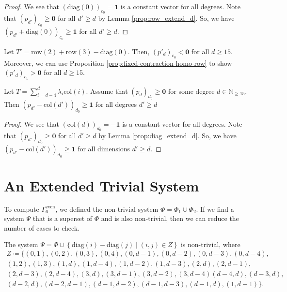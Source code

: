   
\begin{proof}
    We see that \( (\mathrm{diag}(0))_{c_0} = \mathbf 1 \) is a constant vector for all degrees. Note that \( (p_{d'})_{c_0} \geq \mathbf 0 \) for all \( d' \geq d \) by Lemma \ref{prop:row_extend_d}. So, we have \( (p_{d'} + \mathrm{diag}(0))_{c_0} \geq \mathbf 1 \) for all \( d' \geq d \).
\end{proof}
  
  
  
\begin{example}
    Let \( T' = \mathrm{row}(2) + \mathrm{row}(3) - \mathrm{diag}(0) \).
    Then, \( (p'_d)_{c_0} < \mathbf{0} \) for all \( d \geq 15 \). Moreover, we can use Proposition \ref{prop:fixed-contraction-homo-row} to show \( (p'_d)_{c_1} > \mathbf{0} \) for all \( d \geq 15 \).
  \end{example}

\begin{proposition}\label{prop:col_homo_d_zero_diag}
Let \( T = \sum_{i=d-4}^d \lambda_i \mathrm{col}(i)\). Assume that \( (p_d)_{d_0} \geq \mathbf{0} \) for some degree \( d \in \mathbb{N}_{\geq 15} \). Then \( (p_{d'} - \mathrm{col}(d'))_{d_0} \geq \mathbf 1 \) for all degrees \( d' \geq d \)
\end{proposition}
  
\begin{proof}
We see that \( (\mathrm{col}(d))_{d_0} = -\mathbf 1 \) is a constant vector for all degrees. Note that \( (p_{d'})_{d_0} \geq \mathbf 0 \) for all \( d' \geq d \) by Lemma \ref{prop:diag_extend_d}. So, we have \( (p_{d'} - \mathrm{col}(d'))_{d_0} \geq \mathbf 1 \) for all dimensions \( d' \geq d \).
\end{proof}
  



\section{An Extended Trivial System}

To compute \(  \Gamma^{\mathrm{even}}_6 \), we defined the non-trivial system \( \Phi = \Phi_1 \cup \Phi_2 \). If we find a system \( \Psi \) that is a superset of \( \Phi \) and is also non-trivial, then we can reduce the number of cases to check. 

\begin{proposition}
    The system \( \Psi = \Phi \cup \left\{ \mathrm{diag}(i) - \mathrm{diag}(j) \mid (i,j) \in Z \right\} \) is non-trivial, where 
    \begin{gather*}
        Z \coloneqq \{ (0,1), (0,2), (0,3), (0,4), (0,d-1), (0,d-2), (0,d-3), (0,d-4),\\ (1,2), (1,3), (1, d), (1,d-4), (1,d-2), (1,d-3), (2,d), (2,d-1),\\ (2,d-3), (2, d-4), (3,d), (3,d-1), (3,d-2), (3, d-4)
        (d-4,d), (d-3,d),\\ (d-2,d), (d-2,d-1), (d-1,d-2), (d-1,d-3), (d-1,d), (1, d-1)\}.
    \end{gather*}
\end{proposition}

